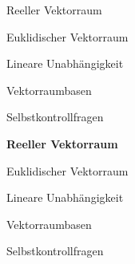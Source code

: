 \documentclass[
  8pt,
  ignorenonframetext,
]{beamer}
\begin{document}
\begin{frame}{}
\protect\hypertarget{section-3}{}
\large
\vfill

Reeller Vektorraum

Euklidischer Vektorraum

Lineare Unabhängigkeit

Vektorraumbasen

Selbstkontrollfragen \vfill
\end{frame}

\begin{frame}{}
\protect\hypertarget{section-4}{}
\large
\vfill

\textbf{Reeller Vektorraum}

Euklidischer Vektorraum

Lineare Unabhängigkeit

Vektorraumbasen

Selbstkontrollfragen \vfill
\end{frame}
\end{document}
